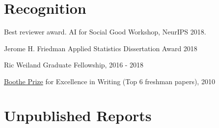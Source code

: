 \documentclass[letterpaper]{article}
\renewenvironment{itemize}{
  \begin{list}{}{
    \setlength{\leftmargin}{1.5em}
  }
}{
  \end{list}
}
\begin{document}
\section*{Recognition}
\begin{itemize}
\item Best reviewer award. AI for Social Good Workshop, NeurIPS 2018.
\item Jerome H. Friedman Applied Statistics Dissertation Award 2018
\item Ric Weiland Graduate Fellowship, 2016 - 2018
\item \href{https://undergrad.stanford.edu/programs/pwr/publications-prizes-and-awards/boothe-prize-essays}{Boothe Prize} for Excellence in Writing (Top 6 freshman papers), 2010
\end{itemize}

\section*{Unpublished Reports}
\end{document}
